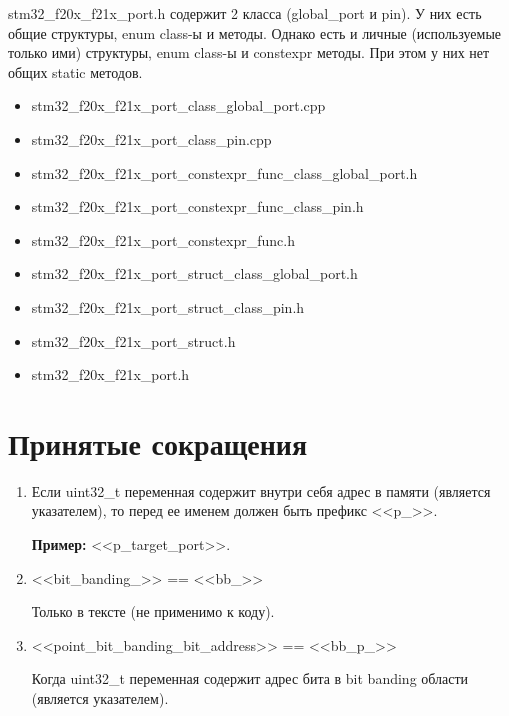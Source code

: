 \begin{enumerate}
	stm32\_f20x\_f21x\_port.h содержит 2 класса (global\_port и pin). У них есть общие структуры, enum class-ы и методы. Однако есть и личные (используемые только ими) структуры, enum class-ы и constexpr методы. При этом у них нет общих static методов.
	\begin{itemize}
		\item stm32\_f20x\_f21x\_port\_class\_global\_port.cpp
		\item stm32\_f20x\_f21x\_port\_class\_pin.cpp 
		\item stm32\_f20x\_f21x\_port\_constexpr\_func\_class\_global\_port.h
		\item stm32\_f20x\_f21x\_port\_constexpr\_func\_class\_pin.h
		\item stm32\_f20x\_f21x\_port\_constexpr\_func.h
		\item stm32\_f20x\_f21x\_port\_struct\_class\_global\_port.h
		\item stm32\_f20x\_f21x\_port\_struct\_class\_pin.h
		\item stm32\_f20x\_f21x\_port\_struct.h
		\item stm32\_f20x\_f21x\_port.h
	\end{itemize}
\end{enumerate}

\section{Принятые сокращения}
\label{sk:0}
\begin{enumerate}
	\item Если uint32\_t переменная содержит внутри себя адрес в памяти (является указателем), то перед ее именем должен быть префикс <<p\_>>.
	
	\textbf{Пример:} <<p\_target\_port>>.
	\item <<bit\_banding\_>> == <<bb\_>>
	
	Только в тексте (не применимо к коду).
	\item <<point\_bit\_banding\_bit\_address>> == <<bb\_p\_>>
	
	Когда uint32\_t переменная содержит адрес бита в bit banding области (является указателем).
	
\end{enumerate}

